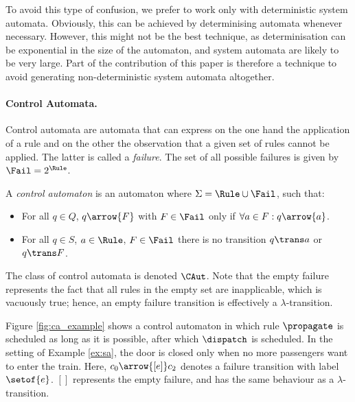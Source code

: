 To avoid this type of confusion, we prefer to work only with deterministic
system automata.  Obviously, this can be achieved by determinising automata
whenever necessary. However, this might not be the best technique, as
determinisation can be exponential in the size of the automaton, and system
automata are likely to be very large. Part of the contribution of this paper is
therefore a technique to avoid generating non-deterministic system automata
altogether.

\paragraph{Control Automata.}

Control automata are automata that can express on the one hand the application
of a rule and on the other the observation that a given set of rules cannot be
applied. The latter is called a \emph{failure}. The set of all possible
failures is given by $\Fail = 2^{\Rule}$.
%
\begin{definition}
  A \emph{control automaton} is an automaton where $\Sigma = \Rule \cup \Fail$,
  such that:
\begin{itemize}
\item For all $q\in Q$, $q \arrow{F}$ with $F\in \Fail$ only if $\forall a
  \in F : q \arrow{a}$.
\item For all $q\in S$, $a\in \Rule$, $F\in \Fail$ there is no transition $q\trans a$ or $q\trans F$.
\end{itemize}
\end{definition} 
%
The class of control automata is denoted $\CAut$. Note that the empty failure
represents the fact that all rules in the empty set are inapplicable, which is
vacuously true; hence, an empty failure transition is effectively a
$\lambda$-transition.
%
\begin{example}\label{ex:ca}
  Figure \ref{fig:ca_example} shows a control automaton in which rule
  $\propagate$ is scheduled as long as it is possible, after which $\dispatch$
  is scheduled. In the setting of Example \ref{ex:sa}, the door is closed only
  when no more passengers want to enter the train. Here, $c_0 \arrow{[e]} c_2$
  denotes a failure transition with label $\setof{e}$. $[]$ represents the empty failure, and has the same behaviour as a $\lambda$-transition.
\end{example}

